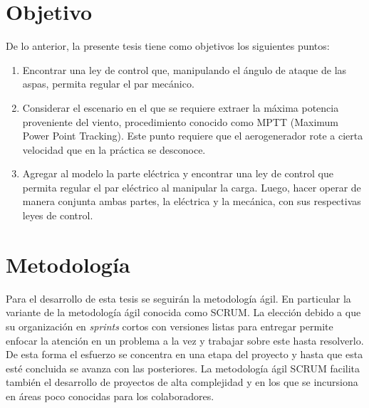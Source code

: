 \section{Objetivo}
\noindent De lo anterior, la presente tesis tiene como objetivos los siguientes puntos:
\begin{enumerate}
\item Encontrar una ley de control que, manipulando el ángulo de ataque de las aspas, 
permita regular el par mecánico.
\item Considerar el escenario en el que se requiere extraer la máxima potencia proveniente 
del viento, procedimiento conocido como MPTT (Maximum Power Point Tracking). Este punto 
requiere que el aerogenerador rote a cierta velocidad que en la práctica se desconoce.
\item Agregar al modelo la parte eléctrica y encontrar una ley de control que permita 
regular el par eléctrico al manipular la carga. Luego, hacer operar de manera conjunta 
ambas partes, la eléctrica y la mecánica, con sus respectivas leyes de control. 
\end{enumerate}


\section{Metodología}

\noindent Para el desarrollo de esta tesis se seguirán la metodología ágil. En particular 
la variante de la metodología ágil conocida como SCRUM. La elección debido a que su 
organización en \emph{sprints} cortos con versiones listas para entregar permite 
enfocar la atención en un problema a la vez y trabajar sobre este hasta resolverlo. 
De esta forma el esfuerzo se concentra en una etapa del proyecto y hasta que esta 
esté concluida se avanza con las posteriores. La metodología ágil SCRUM facilita 
también el desarrollo de proyectos de alta complejidad y en los que se incursiona 
en áreas poco conocidas para los colaboradores. 